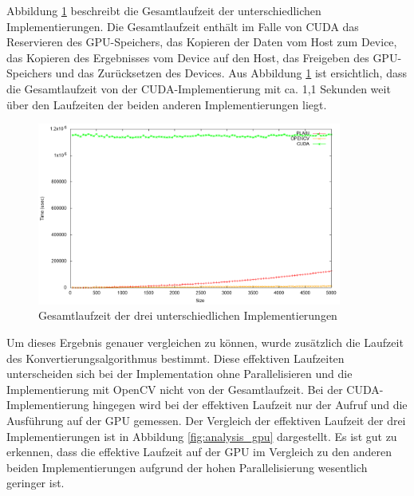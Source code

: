 \documentclass{llncs}
\begin{document}
Abbildung \ref{fig:analysis} beschreibt die Gesamtlaufzeit der unterschiedlichen Implementierungen. Die Gesamtlaufzeit enthält im Falle von CUDA das Reservieren des GPU-Speichers, das Kopieren der Daten vom Host zum Device, das Kopieren des Ergebnisses vom Device auf den Host, das Freigeben des GPU-Speichers und das Zurücksetzen des Devices. Aus Abbildung \ref{fig:analysis} ist ersichtlich, dass die Gesamtlaufzeit von der CUDA-Implementierung mit ca. 1,1 Sekunden weit über den Laufzeiten der beiden anderen Implementierungen liegt.

\begin{figure}
	\centering
	\includegraphics[width=10cm,keepaspectratio]{analysis.png}
	\caption{Gesamtlaufzeit der drei unterschiedlichen Implementierungen}
	\label{fig:analysis}
\end{figure}

Um dieses Ergebnis genauer vergleichen zu können, wurde zusätzlich die Laufzeit des Konvertierungsalgorithmus bestimmt. Diese effektiven Laufzeiten unterscheiden sich bei der Implementation ohne Parallelisieren und die Implementierung mit OpenCV nicht von der Gesamtlaufzeit. Bei der CUDA-Implementierung hingegen wird bei der effektiven Laufzeit nur der Aufruf und die Ausführung auf der GPU gemessen. Der Vergleich der effektiven Laufzeit der drei Implementierungen ist in Abbildung \ref{fig:analysis_gpu} dargestellt. Es ist gut zu erkennen, dass die effektive Laufzeit auf der GPU im Vergleich zu den anderen beiden Implementierungen aufgrund der hohen Parallelisierung wesentlich geringer ist.
\end{document}
